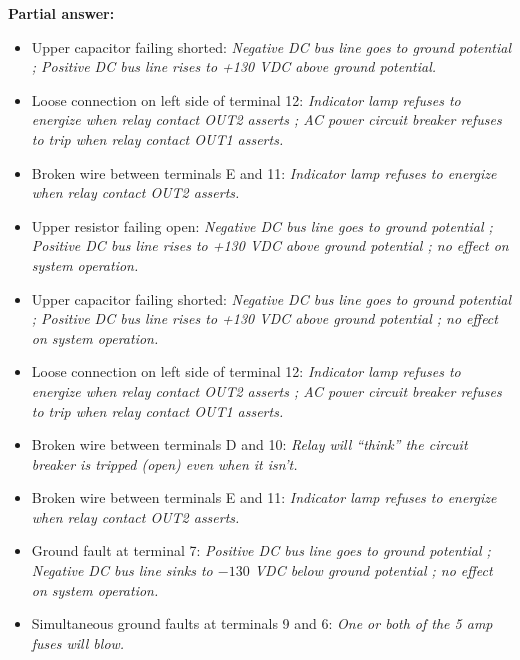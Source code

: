 





\noindent
{\bf Partial answer:}

\begin{itemize}
\item{} Upper capacitor failing shorted: {\it Negative DC bus line goes to ground potential ; Positive DC bus line rises to +130 VDC above ground potential.} 
\vskip 5pt
\item{} Loose connection on left side of terminal 12: {\it Indicator lamp refuses to energize when relay contact OUT2 asserts ; AC power circuit breaker refuses to trip when relay contact OUT1 asserts.}
\vskip 5pt
\item{} Broken wire between terminals E and 11: {\it Indicator lamp refuses to energize when relay contact OUT2 asserts.}
\end{itemize}







\begin{itemize}
\item{} Upper resistor failing open: {\it Negative DC bus line goes to ground potential ; Positive DC bus line rises to +130 VDC above ground potential ; no effect on system operation.}
\vskip 5pt
\item{} Upper capacitor failing shorted: {\it Negative DC bus line goes to ground potential ; Positive DC bus line rises to +130 VDC above ground potential ; no effect on system operation.} 
\vskip 5pt
\item{} Loose connection on left side of terminal 12: {\it Indicator lamp refuses to energize when relay contact OUT2 asserts ; AC power circuit breaker refuses to trip when relay contact OUT1 asserts.}
\vskip 5pt
\item{} Broken wire between terminals D and 10: {\it Relay will ``think'' the circuit breaker is tripped (open) even when it isn't.}
\vskip 5pt
\item{} Broken wire between terminals E and 11: {\it Indicator lamp refuses to energize when relay contact OUT2 asserts.}
\vskip 5pt
\item{} Ground fault at terminal 7: {\it Positive DC bus line goes to ground potential ; Negative DC bus line sinks to $-130$ VDC below ground potential ; no effect on system operation.}
\vskip 5pt
\item{} Simultaneous ground faults at terminals 9 and 6: {\it One or both of the 5 amp fuses will blow.}
\end{itemize}




